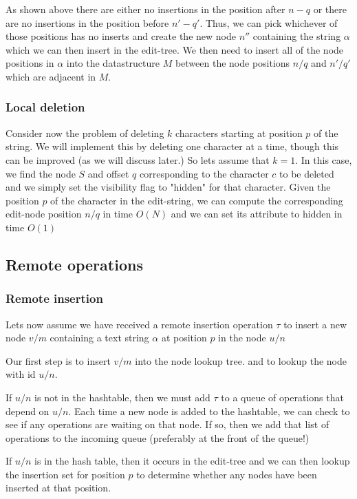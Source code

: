 \documentclass{amsart}
\begin{document}
As shown above
there are either no insertions in the position after $n-q$ or there are
no insertions in the position before $n'-q'$.  Thus, we can pick whichever
of those positions has no inserts and create the new node $n''$ containing
the string $\alpha$ which we can then insert in the edit-tree.  We then need
to insert all of the node positions in $\alpha$ into the datastructure $M$
between the node positions $n/q$ and $n'/q'$ which are adjacent in $M$.




\subsubsection{Local deletion}
Consider now the problem of deleting $k$ characters 
starting at position $p$ of the string.
We will implement this by deleting one character at a time, though this can be
improved (as we will discuss later.) So lets assume that $k=1$. In this case,
we find the node $S$ and offset $q$ corresponding to the character $c$ to be deleted
and we simply set the visibility flag to "hidden" for that character.
Given the position $p$ of the character in the edit-string, we can compute the
corresponding edit-node position $n/q$ in time $O(N)$ and we can set its
attribute to hidden in time $O(1)$

\subsection{Remote operations}
\subsubsection{Remote insertion}
Lets now assume we have received a remote insertion operation $\tau$
to insert a new node $v/m$ containing a text string $\alpha$  
at position $p$ 
in the node $u/n$

Our first step is to insert $v/m$ into the node lookup tree.
and to lookup the node with id $u/n$. 

If $u/n$ is not in the hashtable, then we must add $\tau$ to a queue of
operations that depend on $u/n$.
Each time a new node is added to the hashtable, we can check to see if any
operations are waiting on that node. If so, then we add that list of operations
to the incoming queue (preferably at the front of the queue!)

If $u/n$ is in the hash table, then it occurs 
in the edit-tree and we can then lookup the insertion set
for position $p$ to determine whether 
any nodes have been inserted at that position.
\end{document}

